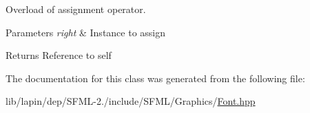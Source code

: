 Overload of assignment operator. 


\begin{DoxyParams}{Parameters}
{\em right} & Instance to assign\\
\hline
\end{DoxyParams}
\begin{DoxyReturn}{Returns}
Reference to self 
\end{DoxyReturn}


The documentation for this class was generated from the following file\-:\begin{DoxyCompactItemize}
\item 
lib/lapin/dep/\-S\-F\-M\-L-\/2./include/\-S\-F\-M\-L/\-Graphics/\hyperlink{lapin_2dep_2_s_f_m_l-2_83_2include_2_s_f_m_l_2_graphics_2_font_8hpp}{Font.\-hpp}\end{DoxyCompactItemize}
